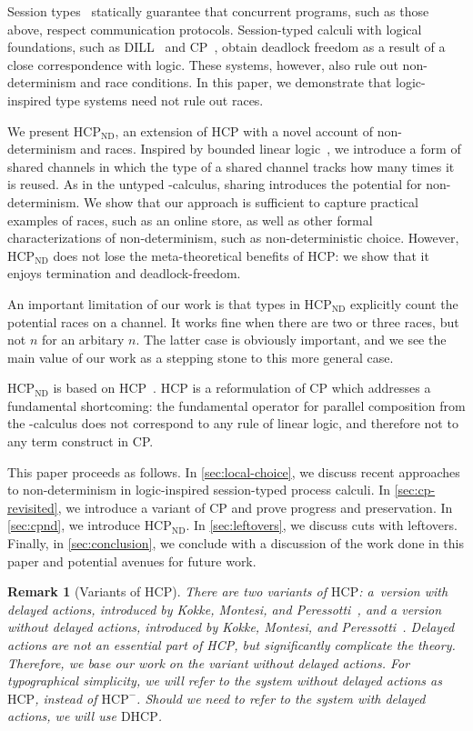 \documentclass{lmcs}
\providecommand{\dhcp}{\ensuremath{\text{DHCP}}\xspace}
\providecommand{\hcp}{\ensuremath{\text{HCP}}\xspace}
\providecommand{\nodcap}{\ensuremath{\hcp_{\text{ND}}}\xspace}
\providecommand{\piDILL}{\textpi DILL\xspace}
\providecommand{\cp}{CP\xspace}
\newtheorem*{remark}{Remark}
\begin{document}
Session types~\cite{honda1993} statically guarantee that concurrent programs, such as those above, respect communication protocols. Session-typed calculi with logical foundations, such as \piDILL~\cite{caires2010} and CP~\cite{wadler2012}, obtain deadlock freedom as a result of a close correspondence with logic. These systems, however, also rule out non-determinism and race conditions. In this paper, we demonstrate that logic-inspired type systems need not rule out races.

We present \nodcap, an extension of \hcp with a novel account of non-determinism and races. Inspired by bounded linear logic~\cite{girard1992}, we introduce a form of shared channels in which the type of a shared channel tracks how many times it is reused. As in the untyped \textpi-calculus, sharing introduces the potential for non-determinism. We show that our approach is sufficient to capture practical examples of races, such as an online store, as well as other formal characterizations of non-determinism, such as non-deterministic choice.  However, \nodcap does not lose the meta-theoretical benefits of \hcp: we show that it enjoys termination and deadlock-freedom.

An important limitation of our work is that types in \nodcap explicitly count the potential races on a channel.  It works fine when there are two or three races, but not $n$ for an arbitary $n$.  The latter case is obviously important, and we see the main value of our work as a stepping stone to this more general case.

\nodcap is based on \hcp~\cite{kokke2018tlla,kokke2019pacmpl}. \hcp is a reformulation of CP which addresses a fundamental shortcoming: the fundamental operator for parallel composition from the \textpi-calculus does not correspond to any rule of linear logic, and therefore not to any term construct in CP.

This paper proceeds as follows. In \cref{sec:local-choice}, we discuss recent approaches to non-determinism in logic-inspired session-typed process calculi. In \cref{sec:cp-revisited}, we introduce a variant of \cp and prove progress and preservation. In \cref{sec:cpnd}, we introduce \nodcap. In \cref{sec:leftovers}, we discuss cuts with leftovers. Finally, in \cref{sec:conclusion}, we conclude with a discussion of the work done in this paper and potential avenues for future work.

\begin{remark}[Variants of \hcp]
  There are two variants of \hcp: a~version with delayed actions, introduced by Kokke, Montesi, and Peressotti~\cite{kokke2019pacmpl}, and a version without delayed actions, introduced by Kokke, Montesi, and Peressotti~\cite{kokke2018tlla}.
  Delayed actions are not an essential part of HCP, but significantly complicate the theory. Therefore, we base our work on the variant without delayed actions. For typographical simplicity, we will refer to the system without delayed actions as \hcp, instead of $\hcp^{-}$. Should we need to refer to the system with delayed actions, we will use \dhcp.
\end{remark}
\end{document}
